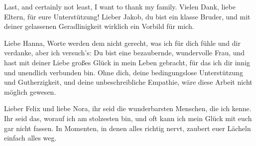 \documentclass[
12pt, %
ngerman,
english, %
onehalfspacing,
hidelinks,
toctotoc, %
headsepline, %
]{MastersDoctoralThesis} %
\begin{document}
\begin{acknowledgements}
\vspace{\baselineskip}

Last, and certainly not least, I want to thank my family. Vielen Dank, liebe Eltern, für eure Unterstützung! Lieber Jakob, du bist ein klasse Bruder, und mit deiner gelassenen Geradlinigkeit wirklich ein Vorbild für mich.

\vspace{\baselineskip}

Liebe Hanna, Worte werden dem nicht gerecht, was ich für dich fühle und dir verdanke, aber ich versuch's: Du bist eine bezaubernde, wundervolle Frau, und hast mit deiner Liebe großes Glück in mein Leben gebracht, für das ich dir innig und unendlich verbunden bin. Ohne dich, deine bedingungslose Unterstützung und Gutherzigkeit, und deine unbeschreibliche Empathie, wäre diese Arbeit nicht möglich gewesen.

\vspace{\baselineskip}

Lieber Felix und liebe Nora, ihr seid die wunderbarsten Menschen, die ich kenne. Ihr seid das, worauf ich am stolzesten bin, und oft kann ich mein Glück mit euch gar nicht fassen. In Momenten, in denen alles richtig nervt, zaubert euer Lächeln einfach alles weg.



\end{acknowledgements}



\tableofcontents %

\listoffigures %

\listoftables %

\end{document}
